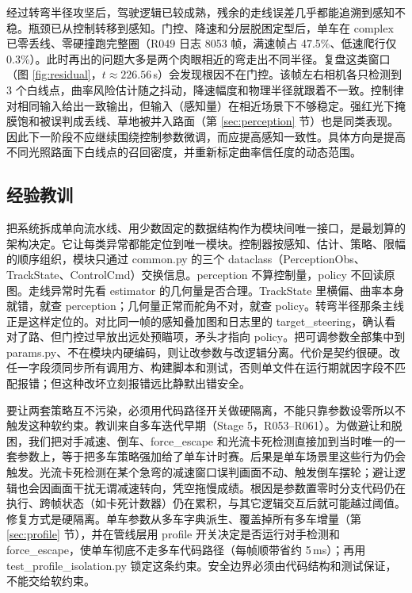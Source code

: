 \documentclass[UTF8,a4paper]{ctexart}
\begin{document}
经过转弯半径攻坚后，驾驶逻辑已较成熟，残余的走线误差几乎都能追溯到感知不稳。瓶颈已从控制转移到感知。门控、降速和分层脱困定型后，单车在 complex 已零丢线、零硬撞跑完整圈（R049 日志 8053 帧，满速帧占 47.5\%、低速爬行仅 0.3\%）。此时再出的问题大多是两个肉眼相近的弯走出不同半径。复盘这类窗口（图 \ref{fig:residual}，$t\approx226.56$\,s）会发现根因不在门控。该帧左右相机各只检测到 3 个白线点，曲率风险估计随之抖动，降速幅度和物理半径就跟着不一致。控制律对相同输入给出一致输出，但输入（感知量）在相近场景下不够稳定。强红光下掩膜饱和被误判成丢线、草地被并入路面（第 \ref{sec:perception} 节）也是同类表现。因此下一阶段不应继续围绕控制参数微调，而应提高感知一致性。具体方向是提高不同光照路面下白线点的召回密度，并重新标定曲率信任度的动态范围。

\subsection{经验教训}

把系统拆成单向流水线、用少数固定的数据结构作为模块间唯一接口，是最划算的架构决定。它让每类异常都能定位到唯一模块。控制器按感知、估计、策略、限幅的顺序组织，模块只通过 common.py 的三个 dataclass（PerceptionObs、TrackState、ControlCmd）交换信息。perception 不算控制量，policy 不回读原图。走线异常时先看 estimator 的几何量是否合理。TrackState 里横偏、曲率本身就错，就查 perception；几何量正常而舵角不对，就查 policy。转弯半径那条主线正是这样定位的。对比同一帧的感知叠加图和日志里的 target\_steering，确认看对了路、但门控过早放出远处预瞄项，矛头才指向 policy。把可调参数全部集中到 params.py、不在模块内硬编码，则让改参数与改逻辑分离。代价是契约很硬。改任一字段须同步所有调用方、构建脚本和测试，否则单文件在运行期就因字段不匹配报错；但这种改坏立刻报错远比静默出错安全。

要让两套策略互不污染，必须用代码路径开关做硬隔离，不能只靠参数设零所以不触发这种软约束。教训来自多车迭代早期（Stage 5，R053--R061）。为做避让和脱困，我们把对手减速、倒车、force\_escape 和光流卡死检测直接加到当时唯一的一套参数上，等于把多车策略强加给了单车计时赛。后果是单车场景里这些行为仍会触发。光流卡死检测在某个急弯的减速窗口误判画面不动、触发倒车摆轮；避让逻辑也会因画面干扰无谓减速转向，凭空拖慢成绩。根因是参数置零时分支代码仍在执行、跨帧状态（如卡死计数器）仍在累积，与其它逻辑交互后就可能越过阈值。修复方式是硬隔离。单车参数从多车字典派生、覆盖掉所有多车增量（第 \ref{sec:profile} 节），并在管线层用 profile 开关决定是否运行对手检测和 force\_escape，使单车彻底不走多车代码路径（每帧顺带省约 5\,ms）；再用 test\_profile\_isolation.py 锁定这条约束。安全边界必须由代码结构和测试保证，不能交给软约束。
\end{document}
